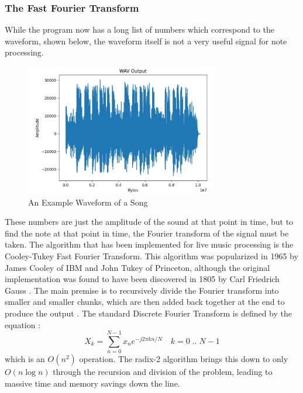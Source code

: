 \documentclass[UTF8, 12pt]{article}
\begin{document}
\subsubsection{The Fast Fourier Transform}
    While the program now has a long list of numbers which correspond to the waveform, shown below, the waveform itself is not a very useful signal for note processing.
    \begin{figure}[h]
        \centering
        \includegraphics[width=0.75\textwidth]{waveform.png}
        \caption{An Example Waveform of a Song}
    \end{figure}
    These numbers are just the amplitude of the sound at that point in time, but to find the note at that point in time, the Fourier transform of the signal must be taken. The algorithm that has been implemented for live music processing is the Cooley-Tukey Fast Fourier Transform. This algorithm was popularized in 1965 by James Cooley of IBM and John Tukey of Princeton, although the original implementation was found to have been discovered in 1805 by Carl Friedrich Gauss \cite{fft_wiki}. The main premise is to recursively divide the Fourier transform into smaller and smaller chunks, which are then added back together at the end to produce the output \cite{fft_paper}. The standard Discrete Fourier Transform is defined by the equation \cite{fft_wiki}:
    \begin{equation}
        X_k = \sum_{n=0}^{N-1}x_ne^{-j2{\pi}kn/N} \quad k = 0 \; .. \; N - 1
    \end{equation}
    which is an $O(n^2)$ operation. The radix-2 algorithm brings this down to only $O(n\log{}n)$ through the recursion and division of the problem, leading to massive time and memory savings down the line.
\end{document}
